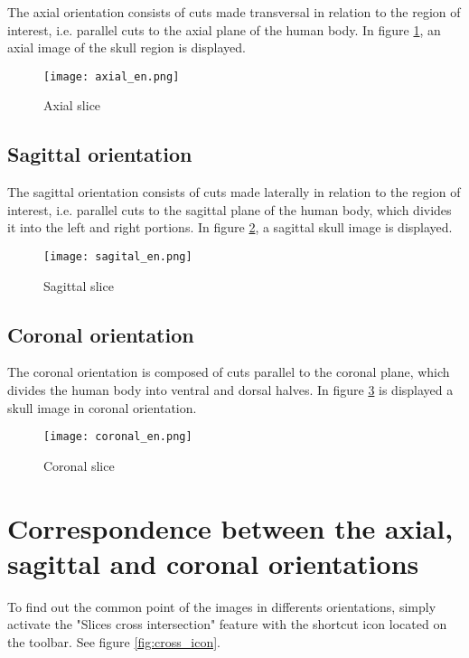 The axial orientation consists of cuts made transversal in relation to the region of interest, i.e. parallel cuts to the axial plane of the human body.
In figure \ref{fig:axial_corte}, an axial image of the skull region is displayed.

\begin{figure}[!htb]
\centering
\texttt{[image: axial\_en.png]}
\caption{Axial slice}
\label{fig:axial_corte}
\end{figure}

\subsection{Sagittal orientation}

The sagittal orientation consists of cuts made laterally in relation to the region of interest, i.e. parallel cuts to the sagittal plane of the human body, which divides it into the left and right portions.
In figure \ref{fig:sagital_slice}, a sagittal skull image is displayed.

\begin{figure}[!htb]
\centering
\texttt{[image: sagital\_en.png]}
\caption{Sagittal slice}
\label{fig:sagital_slice}
\end{figure}

\newpage

\subsection{Coronal orientation}

The coronal orientation is composed of cuts parallel to the coronal plane, which divides the human body into ventral and dorsal halves.
In figure \ref{fig:coronal_slice} is displayed  a skull image in coronal orientation.

\begin{figure}[!htb]
\centering
\texttt{[image: coronal\_en.png]}
\caption{Coronal slice}
\label{fig:coronal_slice}
\end{figure}


\section{Correspondence between the axial, sagittal and coronal orientations}
\label{sec:corresp_all_orient}

To find out the common point of the images in differents orientations, simply activate the "Slices cross intersection" feature with the shortcut icon located on the toolbar.
See figure \ref{fig:cross_icon}.


